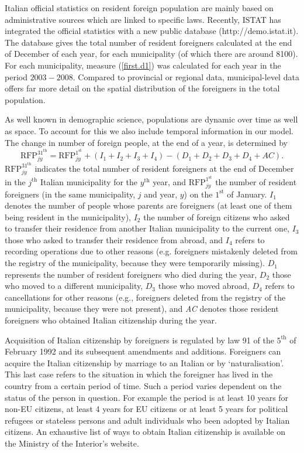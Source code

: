 \documentclass[10pt] {article}
\theoremstyle{definition}
\theoremstyle{plain}
\begin{document}
Italian official statistics on resident foreign population are mainly based on administrative sources which are linked to specific laws. Recently, ISTAT has integrated the official statistics with a new public database (http://demo.istat.it). The database gives the total number of resident foreigners calculated at the end of December of each year, for each municipality (of which there are around 8100). For each municipality, measure (\ref{first.d1}) was calculated for each year in the period $2003-2008$. Compared to provincial or regional data, municipal-level data offers far more detail on the spatial distribution of the foreigners in the total population.
 
As well known in demographic science, populations are dynamic over time as well as space. To account for this we also include temporal information in our model. The change in number of foreign people, at the end of a year, is determined by
$$
\text{RFP}^{31^\text{th}}_{jy} = \text{RFP}^{1^\text{st}}_{jy} + (I_1 + I_2 + I_3+ I_4) - (D_1 + D_2 + D_3 + D_4 + AC).
$$ 
$\text{RFP}^{31^\text{th}}_{jy}$ indicates the total number of resident foreigners at the end of December in the $j^\text{th}$ Italian municipality for the $y^\text{th}$ year, and $\text{RFP}^{1^\text{st}}_{jy}$ the number of resident foreigners (in the same municipality, $j$ and year, $y$) on the $1^\text{st}$ of January. $I_{1}$ denotes the number of people whose parents are foreigners (at least one of them being resident in the municipality), $I_{2}$ the number of foreign citizens who asked to transfer their residence from another Italian municipality to the current one, $I_{3}$ those who asked to transfer their residence from abroad, and $I_{4}$ refers to recording operations due to other reasons (e.g. foreigners mistakenly deleted from the registry of the municipality, because they were temporarily missing). $D_{1}$ represents the number of resident foreigners who died during the year, $D_{2}$ those who moved to a different municipality, $D_{3}$ those who moved abroad, $D_{4}$ refers to cancellations for other reasons (e.g., foreigners deleted from the registry of the municipality, because they were not present), and \textit{AC} denotes those resident foreigners who obtained Italian citizenship during the year. 

Acquisition of Italian citizenship by foreigners is regulated by law 91 of the $5^\text{th}$ of February 1992 and its subsequent amendments and additions. Foreigners can acquire the Italian citizenship by marriage to an Italian or by `naturalisation'. This last case refers to the situation in which the foreigner has lived in the country from a certain period of time. Such a period varies dependent on the status of the person in question. For example the period is at least 10 years for non-EU citizens, at least 4 years for EU citizens or at least 5 years for political refugees or stateless persons and adult individuals who been adopted by Italian citizens. An exhaustive list of ways to obtain Italian citizenship is available on the Ministry of the Interior's website.
\end{document}
